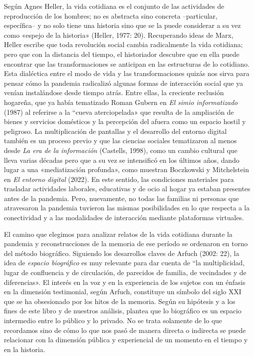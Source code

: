 Según Agnes Heller, la vida cotidiana es el conjunto de las actividades de reproducción de los hombres; no es abstracta sino concreta --particular, específica-- y no solo tiene una historia sino que se la puede considerar a su vez como «espejo de la historia» (Heller, 1977: 20). Recuperando ideas de Marx, Heller escribe que toda revolución social cambia radicalmente la vida cotidiana; pero que con la distancia del tiempo, el historiador descubre que en ella puede encontrar que las transformaciones se anticipan en las estructuras de lo cotidiano. Esta dialéctica entre el modo de vida y las transformaciones quizás nos sirva para pensar cómo la pandemia radicalizó algunas formas de interacción social que ya venían instalándose desde tiempo atrás. Entre ellas, la creciente reclusión hogareña, que ya había tematizado Roman Gubern en \emph{El simio informatizado} (1987) al referirse a la ``cueva aterciopelada» que resulta de la ampliación de bienes y servicios domésticos y la percepción del afuera como un espacio hostil y peligroso. La multiplicación de pantallas y el desarrollo del entorno digital también es un proceso previo y que las ciencias sociales tematizaron al menos desde \emph{La era de la información} (Castells, 1998), como un cambio cultural que lleva varias décadas pero que a su vez se intensificó en los últimos años, dando lugar a una «mediatización profunda», como muestran Boczkowski y Mitchelstein en \emph{El entorno digital} (2022). En este sentido, las condiciones materiales para trasladar actividades laborales, educativas y de ocio al hogar ya estaban presentes antes de la pandemia. Pero, nuevamente, no todas las familias ni personas que atravesaron la pandemia tuvieron las mismas posibilidades en lo que respecta a la conectividad y a las modalidades de interacción mediante plataformas virtuales.

El camino que elegimos para analizar relatos de la vida cotidiana durante la pandemia y reconstrucciones de la memoria de ese período se ordenaron en torno del método biográfico. Siguiendo los desarrollos claves de Arfuch (2002: 22), la idea de \emph{espacio biográfico} es muy relevante para dar cuenta de ``la multiplicidad, lugar de confluencia y de circulación, de parecidos de familia, de vecindades y de diferencias». El interés en la voz y en la experiencia de los sujetos con un énfasis en la dimensión testimonial, según Arfuch, constituye un símbolo del siglo XXI que se ha obsesionado por los hitos de la memoria. Según su hipótesis y a los fines de este libro y de nuestros análisis, plantea que lo biográfico es un espacio intermedio entre lo público y lo privado. No se trata solamente de lo que recordamos sino de cómo lo que nos pasó de manera directa o indirecta se puede relacionar con la dimensión pública y experiencial de un momento en el tiempo y en la historia.

